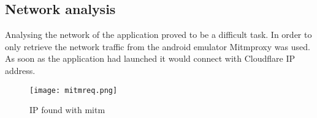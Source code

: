 \subsection{Network analysis}

Analysing the network of the application proved to be a difficult task. 
In order to only retrieve the network traffic from the android emulator Mitmproxy was used.
As soon as the application had launched it would connect with Cloudflare IP address.

\begin{figure}[H]
    \texttt{[image: mitmreq.png]}
    \caption{IP found with mitm}
    \label{tim-mitmrequest}
\end{figure}

